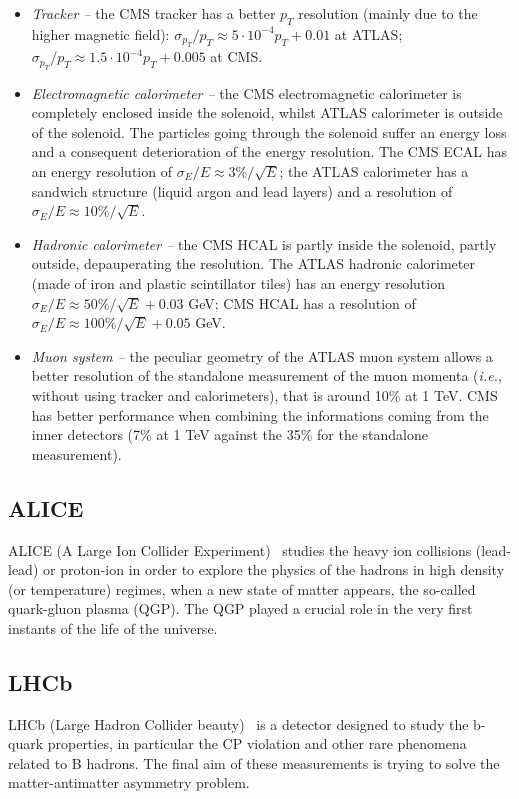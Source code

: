 \begin{itemize}
\item {\itshape Tracker --} the CMS tracker has a better $p_T$ resolution (mainly due to the higher magnetic field): $\sigma_{p_T}/p_T \approx 5 \cdot 10^{-4} p_T + 0.01$ at ATLAS; $\sigma_{p_T}/p_T \approx 1.5 \cdot 10^{-4} p_T + 0.005$ at CMS.
\item {\itshape Electromagnetic calorimeter --} the CMS electromagnetic calorimeter is completely enclosed inside the solenoid, whilst ATLAS calorimeter is outside of the solenoid. The particles going through the solenoid suffer an energy loss and a consequent deterioration of the energy resolution. The CMS ECAL has an energy resolution of $\sigma_E /E \approx 3\%/\sqrt{E}$; the ATLAS calorimeter has a sandwich structure (liquid argon and lead layers) and a resolution of $\sigma_E / E \approx 10\%/\sqrt{E}$.
\item {\itshape Hadronic calorimeter --} the CMS HCAL is partly inside the solenoid, partly outside, depauperating the resolution. The ATLAS hadronic calorimeter (made of iron and plastic scintillator tiles) has an energy resolution $\sigma_E /E \approx 50\%/\sqrt{E} + 0.03$ GeV; CMS HCAL has a resolution of $\sigma_E /E \approx 100\%/\sqrt{E} + 0.05$ GeV.
\item {\itshape Muon system --} the peculiar geometry of the ATLAS muon system allows a better resolution of the standalone measurement of the muon momenta (\textit{i.e.}, without using tracker and calorimeters), that is around 10\% at 1 TeV. CMS has better performance when combining the informations coming from the inner detectors (7\% at 1 TeV against the 35\% for the standalone measurement).
\end{itemize}

\subsection{ALICE}
ALICE (A Large Ion Collider Experiment)~\cite{Aamodt:2008zz} studies the heavy ion collisions (lead-lead) or proton-ion in order to explore the physics of the hadrons in high density (or temperature) regimes, when a new state of matter appears, the so-called quark-gluon plasma (QGP). The QGP played a crucial role in the very first instants of the life of the universe.

\subsection{LHCb}
LHCb (Large Hadron Collider beauty)~\cite{Alves:2008zz} is a detector designed to study the b-quark properties, in particular the CP violation and other rare phenomena related to B hadrons. The final aim of these measurements is trying to solve the matter-antimatter asymmetry problem.

